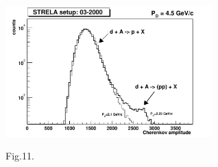 \documentclass[a4paper,12pt]{article}
\begin{document}
    \begin{figure}[hbt]
      \begin{center}
        \includegraphics[width=8cm]{strela.pdf}
      \end{center}
      \vspace{0,4mm}
      Fig.11.
    \end{figure}
\end{document}

